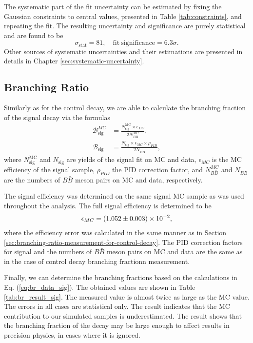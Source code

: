 The systematic part of the fit uncertainty can be estimated by fixing the Gaussian constraints to central values, presented in Table \ref{tab:constraints}, and repeating the fit. The resulting uncertainty and significance are purely statistical and are found to be
\begin{equation}
\sigma_{\mathrm{stat}} = 81,\quad\mathrm{fit~significance} = 6.3\sigma.
\end{equation}
Other sources of systematic uncertainties and their estimations are presented in details in Chapter \ref{sec:systematic-uncertainty}.

\subsection{Branching Ratio}\label{sec:branching-ratio-calculation-for-signal-decay}

Similarly as for the control decay, we are able to calculate the branching fraction of the signal decay via the formulas
\begin{align}
\mathcal{B}^{MC}_{\mathrm{sig}} &= \frac{N^{\mathrm{MC}}_\mathrm{sig} \times \epsilon_{MC}}{2N_{B\bar B}^{MC}},\\
\mathcal{B}_{\mathrm{sig}} &= \frac{N_\mathrm{sig} \times \epsilon_{MC} \times \rho_{PID}}{2N_{B\bar B}},
\label{eq:br_data_sig}
\end{align}
where $N^{\mathrm{MC}}_\mathrm{sig}$ and $N_\mathrm{sig}$ are yields of the signal fit on MC and data, $\epsilon_{MC}$ is the MC efficiency of the signal sample, $\rho_{PID}$ the PID correction factor, and $N_{B\bar B}^{MC}$ and $N_{B\bar B}$ are the numbers of $B \bar B$ meson pairs on MC and data, respectively.

The signal efficiency was determined on the same signal MC sample as was used throughout the analysis. The full signal efficiency is determined to be
\begin{equation*}
\epsilon_{MC} = (1.052 \pm 0.003)\times 10^{-2},
\end{equation*}
where the efficiency error was calculated in the same manner as in Section \ref{sec:branching-ratio-measurement-for-control-decay}. The PID correction factors for signal and the numbers of $B\bar B$ meson pairs on MC and data are the same as in the case of control decay branching fractionn measurement.

Finally, we can determine the branching fractions based on the calculations in Eq. (\ref{eq:br_data_sig}). The obtained values are shown in Table \ref{tab:br_result_sig}. The measured value is almost twice as large as the MC value. The errors in all cases are statistical only. The result indicates that the MC contribution to our simulated samples is underestimated. The result shows that the branching fraction of the decay may be large enough to affect results in precision physics, in cases where it is ignored.


